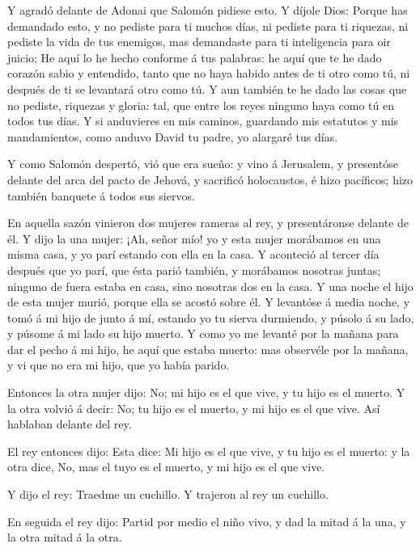  Y agradó delante de Adonai que Salomón pidiese esto.
 Y díjole Dios: Porque has demandado esto, y no pediste
para ti muchos días, ni pediste para ti riquezas, ni pediste la vida de
tus enemigos, mas demandaste para ti inteligencia para oir juicio;
 He aquí lo he hecho conforme á tus palabras: he aquí que
te he dado corazón sabio y entendido, tanto que no haya habido antes de
ti otro como tú, ni después de ti se levantará otro como tú.
 Y aun también te he dado las cosas que no pediste,
riquezas y gloria: tal, que entre los reyes ninguno haya como tú en
todos tus días.  Y si anduvieres en mis caminos, guardando
mis estatutos y mis mandamientos, como anduvo David tu padre, yo
alargaré tus días.

 Y como Salomón despertó, vió que era sueño: y vino á
Jerusalem, y presentóse delante del arca del pacto de Jehová, y
sacrificó holocaustos, é hizo pacíficos; hizo también banquete á todos
sus siervos.

 En aquella sazón vinieron dos mujeres rameras al rey, y
presentáronse delante de él.  Y dijo la una mujer: ¡Ah,
señor mío! yo y esta mujer morábamos en una misma casa, y yo parí
estando con ella en la casa.  Y aconteció al tercer día
después que yo parí, que ésta parió también, y morábamos nosotras
juntas; ninguno de fuera estaba en casa, sino nosotras dos en la casa.
 Y una noche el hijo de esta mujer murió, porque ella se
acostó sobre él.  Y levantóse á media noche, y tomó á mi
hijo de junto á mí, estando yo tu sierva durmiendo, y púsolo á su lado,
y púsome á mi lado su hijo muerto.  Y como yo me levanté
por la mañana para dar el pecho á mi hijo, he aquí que estaba muerto:
mas observéle por la mañana, y vi que no era mi hijo, que yo había
parido.

 Entonces la otra mujer dijo: No; mi hijo es el que vive, y
tu hijo es el muerto. Y la otra volvió á decir: No; tu hijo es el
muerto, y mi hijo es el que vive. Así hablaban delante del rey.

 El rey entonces dijo: Esta dice: Mi hijo es el que vive, y
tu hijo es el muerto: y la otra dice, No, mas el tuyo es el muerto, y mi
hijo es el que vive.

 Y dijo el rey: Traedme un cuchillo. Y trajeron al rey un
cuchillo.

 En seguida el rey dijo: Partid por medio el niño vivo, y
dad la mitad á la una, y la otra mitad á la otra.

